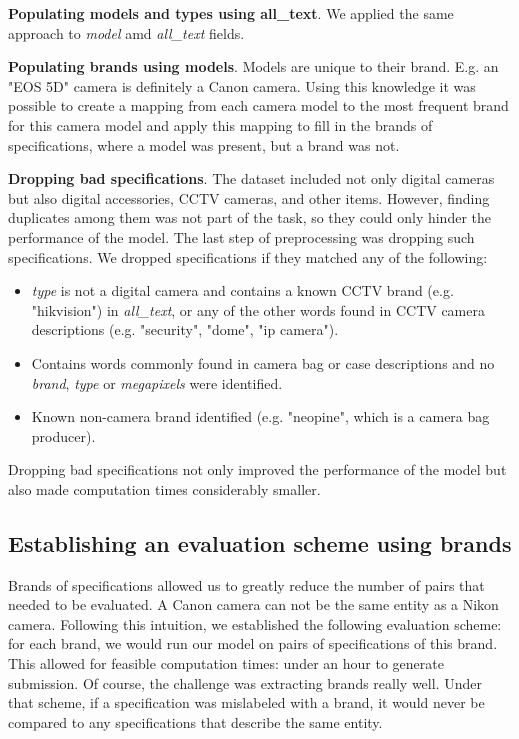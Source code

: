 \documentclass[sigconf]{acmart}
\begin{document}
\textbf{Populating models and types using all\_text}. We applied the same approach to \textit{model} amd \textit{all\_text} fields.

\textbf{Populating brands using models}. Models are unique to their brand. E.g. an "EOS 5D" camera is definitely a Canon camera. Using this knowledge it was possible to create a mapping from each camera model to the most frequent brand for this camera model and apply this mapping to fill in the brands of specifications, where a model was present, but a brand was not.

\textbf{Dropping bad specifications}. The dataset included not only digital cameras but also digital accessories, CCTV cameras, and other items. However, finding duplicates among them was not part of the task, so they could only hinder the performance of the model. The last step of preprocessing was dropping such specifications. We dropped specifications if they matched any of the following:
\begin{itemize}
\item \textit{type} is not a digital camera and contains a known CCTV brand (e.g. "hikvision") in \textit{all\_text}, or any of the other words found in CCTV camera descriptions (e.g. "security", "dome", "ip camera").
\item Contains words commonly found in camera bag or case descriptions and no \textit{brand}, \textit{type} or \textit{megapixels} were identified.
\item Known non-camera brand identified (e.g. "neopine", which is a camera bag producer). 
\end{itemize}

Dropping bad specifications not only improved the performance of the model but also made computation times considerably smaller.



\subsection{Establishing an evaluation scheme using brands}
\label{ev_scheme_brands}

Brands of specifications allowed us to greatly reduce the number of pairs that needed to be evaluated. A Canon camera can not be the same entity as a Nikon camera. Following this intuition, we established the following evaluation scheme: for each brand, we would run our model on pairs of specifications of this brand. This allowed for feasible computation times: under an hour to generate submission. Of course, the challenge was extracting brands really well. Under that scheme, if a specification was mislabeled with a brand, it would never be compared to any specifications that describe the same entity.  
\end{document}
